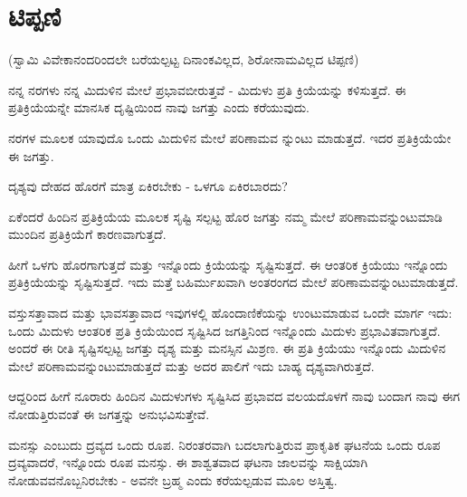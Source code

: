 
\chapter{ಟಿಪ್ಪಣಿ}

(ಸ್ವಾಮಿ ವಿವೇಕಾನಂದರಿಂದಲೇ ಬರೆಯಲ್ಪಟ್ಟ ದಿನಾಂಕವಿಲ್ಲದ, ಶಿರೋನಾಮವಿಲ್ಲದ ಟಿಪ್ಪಣಿ)

ನನ್ನ ನರಗಳು ನನ್ನ ಮಿದುಳಿನ ಮೇಲೆ ಪ್ರಭಾವಬೀರುತ್ತವೆ - ಮಿದುಳು ಪ್ರತಿ ಕ್ರಿಯೆಯನ್ನು ಕಳಿಸುತ್ತದೆ. ಈ ಪ್ರತಿಕ್ರಿಯೆಯನ್ನೇ ಮಾನಸಿಕ ದೃಷ್ಟಿಯಿಂದ ನಾವು ಜಗತ್ತು ಎಂದು ಕರೆಯುವುದು.

ನರಗಳ ಮೂಲಕ ಯಾವುದೊ ಒಂದು ಮಿದುಳಿನ ಮೇಲೆ ಪರಿಣಾಮವ ನ್ನುಂಟು ಮಾಡುತ್ತದೆ. ಇದರ ಪ್ರತಿಕ್ರಿಯೆಯೇ ಈ ಜಗತ್ತು.

ದೃಶ್ಯವು ದೇಹದ ಹೊರಗೆ ಮಾತ್ರ ಏಕಿರಬೇಕು - ಒಳಗೂ ಏಕಿರಬಾರದು?

ಏಕೆಂದರೆ ಹಿಂದಿನ ಪ್ರತಿಕ್ರಿಯೆಯ ಮೂಲಕ ಸೃಷ್ಟಿ ಸಲ್ಪಟ್ಟ ಹೊರ ಜಗತ್ತು ನಮ್ಮ ಮೇಲೆ ಪರಿಣಾಮವನ್ನುಂಟುಮಾಡಿ ಮುಂದಿನ ಪ್ರತಿಕ್ರಿಯೆಗೆ ಕಾರಣವಾಗುತ್ತದೆ.

ಹೀಗೆ ಒಳಗು ಹೊರಗಾಗುತ್ತದೆ ಮತ್ತು ಇನ್ನೊಂದು ಕ್ರಿಯೆಯನ್ನು ಸೃಷ್ಟಿಸುತ್ತದೆ. ಈ ಆಂತರಿಕ ಕ್ರಿಯೆಯು ಇನ್ನೊಂದು ಪ್ರತಿಕ್ರಿಯೆಯನ್ನು ಸೃಷ್ಟಿಸುತ್ತದೆ. ಇದು ಮತ್ತೆ ಬಹಿರ್ಮುಖವಾಗಿ ಅಂತರಂಗದ ಮೇಲೆ ಪರಿಣಾಮವನ್ನುಂಟುಮಾಡುತ್ತದೆ.

ವಸ್ತುಸತ್ತಾವಾದ ಮತ್ತು ಭಾವಸತ್ತಾವಾದ ಇವುಗಳಲ್ಲಿ ಹೊಂದಾಣಿಕೆಯನ್ನು ಉಂಟುಮಾಡುವ ಒಂದೇ ಮಾರ್ಗ ಇದು: ಒಂದು ಮಿದುಳು ಆಂತರಿಕ ಪ್ರತಿ ಕ್ರಿಯೆಯಿಂದ ಸೃಷ್ಟಿಸಿದ ಜಗತ್ತಿನಿಂದ ಇನ್ನೊಂದು ಮಿದುಳು ಪ್ರಭಾವಿತವಾಗುತ್ತದೆ. ಅಂದರೆ ಈ ರೀತಿ ಸೃಷ್ಟಿಸಲ್ಪಟ್ಟ ಜಗತ್ತು ದೃಶ್ಯ ಮತ್ತು ಮನಸ್ಸಿನ ಮಿಶ್ರಣ. ಈ ಪ್ರತಿ ಕ್ರಿಯೆಯು ಇನ್ನೊಂದು ಮಿದುಳಿನ ಮೇಲೆ ಪರಿಣಾಮವನ್ನುಂಟುಮಾಡುತ್ತದೆ ಮತ್ತು ಅದರ ಪಾಲಿಗೆ ಇದು ಬಾಹ್ಯ ದೃಶ್ಯವಾಗಿರುತ್ತದೆ.

ಆದ್ದರಿಂದ ಹೀಗೆ ನೂರಾರು ಹಿಂದಿನ ಮಿದುಳುಗಳು ಸೃಷ್ಟಿಸಿದ ಪ್ರಭಾವದ ವಲಯದೊಳಗೆ ನಾವು ಬಂದಾಗ ನಾವು ಈಗ ನೋಡುತ್ತಿರುವಂತೆ ಈ ಜಗತ್ತನ್ನು ಅನುಭವಿಸುತ್ತೇವೆ.

ಮನಸ್ಸು ಎಂಬುದು ದ್ರವ್ಯದ ಒಂದು ರೂಪ. ನಿರಂತರವಾಗಿ ಬದಲಾಗುತ್ತಿರುವ ಪ್ರಾಕೃತಿಕ ಘಟನೆಯ ಒಂದು ರೂಪ ದ್ರವ್ಯವಾದರೆ, ಇನ್ನೊಂದು ರೂಪ ಮನಸ್ಸು. ಈ ಶಾಶ್ವತವಾದ ಘಟನಾ ಜಾಲವನ್ನು ಸಾಕ್ಷಿಯಾಗಿ ನೋಡುವವನೊಬ್ಬನಿರಬೇಕು - ಅವನೇ ಬ್ರಹ್ಮ ಎಂದು ಕರೆಯಲ್ಪಡುವ ಮೂಲ ಅಸ್ತಿತ್ವ.

